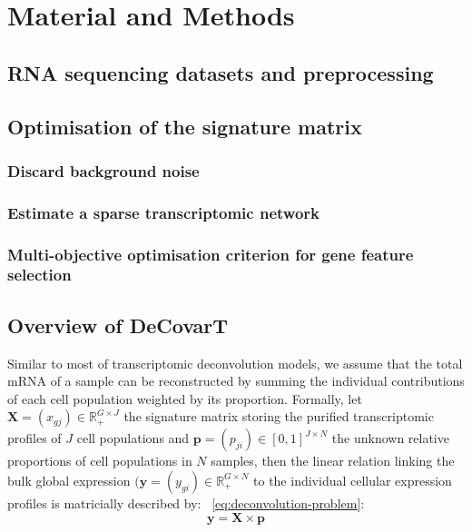 \documentclass[long, final]{jobim}
\begin{document}
\section{Material and Methods}
\label{sec:methods}

\subsection{RNA sequencing datasets and preprocessing}
\label{subsec:preprocessing}

\subsection{Optimisation of the signature matrix}
\label{subsec:signature-matrix}

\subsubsection{Discard background noise}
\label{subsubsec:background-noise}

\subsubsection{Estimate a sparse transcriptomic network}
\label{subsubsec:gLasso}

\subsubsection{Multi-objective optimisation criterion for gene feature selection}
\label{subsubsec:genetic-algorithm}

\subsection{Overview of DeCovarT}
\label{subsec:DeCovarT}

Similar to most of transcriptomic deconvolution models, we assume that the total mRNA of a sample can be reconstructed by summing the individual contributions of each cell population weighted by its proportion. Formally, let \(\boldsymbol{X}=(x_{gj}) \in \mathbb{R}_+^{G\times J}\) the signature matrix storing the purified transcriptomic profiles of $J$ cell populations and \(\boldsymbol{p}=(p_{ji})\in [0, 1]^{J \times N}\) the unknown relative proportions of cell populations in $N$ samples, then the linear relation linking the bulk global expression $(\boldsymbol{y}=(y_{gi}) \in \mathbb{R}_+^{G\times N}$ to the individual cellular expression profiles is matricially described by: \equationname~\ref{eq:deconvolution-problem}:
\begin{equation}
\label{eq:deconvolution-problem}
\boldsymbol{y}=\boldsymbol{X} \times \boldsymbol{p}
\end{equation}
\end{document}
